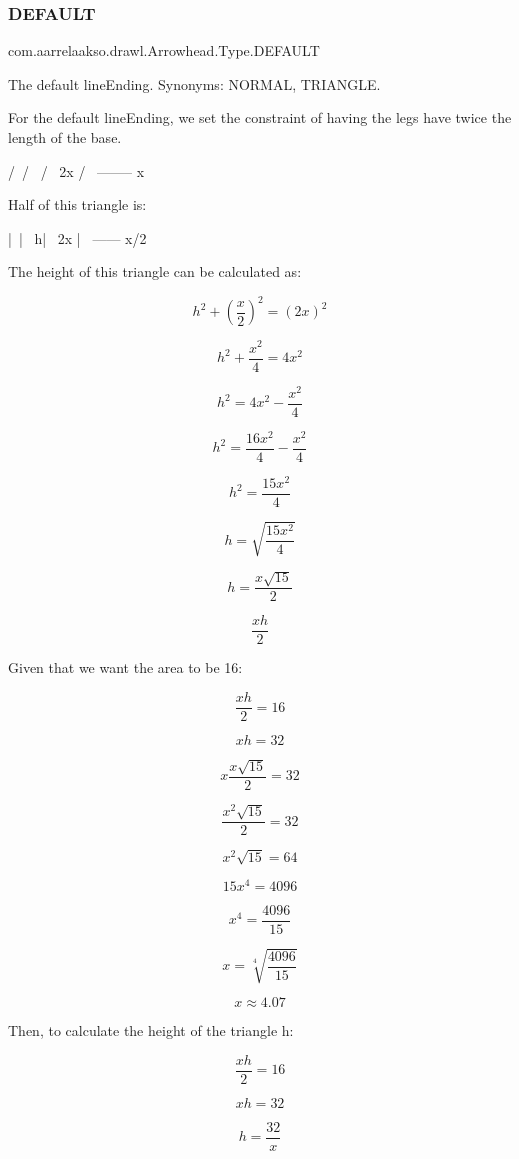 \subsubsection{\texorpdfstring{D\+E\+F\+A\+U\+LT}{DEFAULT}}
{\footnotesize\ttfamily com.\+aarrelaakso.\+drawl.\+Arrowhead.\+Type.\+D\+E\+F\+A\+U\+LT}

The default lineEnding. Synonyms\+: N\+O\+R\+M\+AL, T\+R\+I\+A\+N\+G\+LE.

For the default lineEnding, we set the constraint of having the legs have twice the length of the base. \begin{DoxyVerb}      /\
     /  \
    /    \  2x
   /      \
   --------
      x
\end{DoxyVerb}


Half of this triangle is\+: \begin{DoxyVerb}    |\
    | \
   h|  \  2x
    |   \
    ------
     x/2
\end{DoxyVerb}


The height of this triangle can be calculated as\+:

\[h^2 + (\frac{x}{2})^2 = (2x)^2\]

\[h^2 + \frac{x^2}{4} = 4x^2\]

\[h^2 = 4x^2 - \frac{x^2}{4}\]

\[h^2 = \frac{16x^2}{4} - \frac{x^2}{4}\]

\[h^2 = \frac{15x^2}{4}\]

\[h = \sqrt{\frac{15x^2}{4}}\]

\[h = \frac{x \sqrt{15}}{2}\]

\[\frac{xh}{2}\]

Given that we want the area to be 16\+:

\[ \frac{xh}{2} = 16\]

\[xh = 32\]

\[x \frac{x \sqrt{15}}{2} = 32\]

\[\frac{x^2 \sqrt{15}}{2} = 32\]

\[ x^2 \sqrt{15} = 64\]

\[15 x^4 = 4096\]

\[x^4 = \frac{4096}{15}\]

\[x = \sqrt[4]{\frac{4096}{15}}\]

\[x \approx 4.07\]

Then, to calculate the height of the triangle h\+:

\[\frac{xh}{2} = 16\]

\[xh = 32\]

\[h = \frac{32}{x}\]

